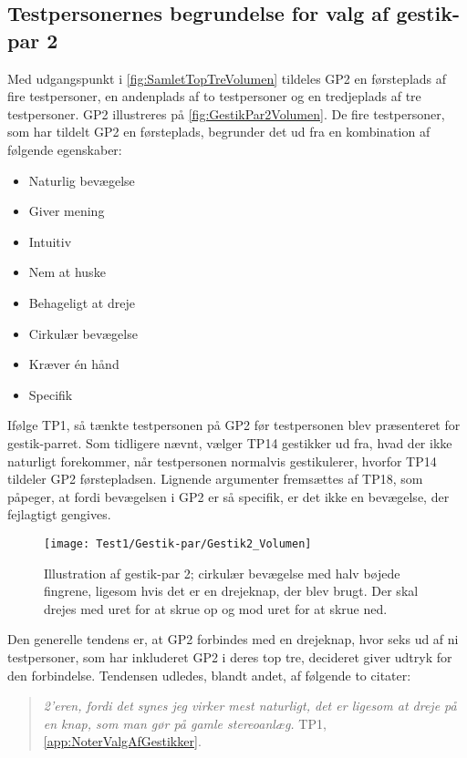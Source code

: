 \subsection{Testpersonernes begrundelse for valg af gestik-par 2}
\label{TestresultaterValgAfGestikkerBegrundelseGP2Volumen}
%
Med udgangspunkt i \autoref{fig:SamletTopTreVolumen} tildeles GP2 en førsteplads af fire testpersoner, en andenplads af to testpersoner og en tredjeplads af tre testpersoner. GP2 illustreres på \autoref{fig:GestikPar2Volumen}. De fire testpersoner, som har tildelt GP2 en førsteplads, begrunder det ud fra en kombination af følgende egenskaber: 
%
\begin{multicols}{3}
    \begin{itemize}
        \item Naturlig bevægelse
        \item Giver mening
        \item Intuitiv 
        \item Nem at huske
        \item Behageligt at dreje
        \item Cirkulær bevægelse
        \item Kræver én hånd
        \item Specifik
\end{itemize}
\end{multicols}
\noindent
%
Ifølge TP1, så tænkte testpersonen på GP2 før testpersonen blev præsenteret for gestik-parret. Som tidligere nævnt, vælger TP14 gestikker ud fra, hvad der ikke naturligt forekommer, når testpersonen normalvis gestikulerer, hvorfor TP14 tildeler GP2 førstepladsen. Lignende argumenter fremsættes af TP18, som påpeger, at fordi bevægelsen i GP2 er så specifik, er det ikke en bevægelse, der fejlagtigt gengives. 
%
\begin{figure}[H]
	\centering
	\texttt{[image: Test1/Gestik-par/Gestik2\_Volumen]}
	\caption{Illustration af gestik-par 2; cirkulær bevægelse med halv bøjede fingrene, ligesom hvis det er en drejeknap, der blev brugt. Der skal drejes med uret for at skrue op og mod uret for at skrue ned.}
	\label{fig:GestikPar2Volumen}
\end{figure}
\noindent
%
Den generelle tendens er, at GP2 forbindes med en drejeknap, hvor seks ud af ni testpersoner, som har inkluderet GP2 i deres top tre, decideret giver udtryk for den forbindelse. Tendensen udledes, blandt andet, af følgende to citater: 
%
\begin{quotation}
	\noindent
	\textit{2'eren, fordi det synes jeg virker mest naturligt, det er ligesom at dreje på en knap, som man gør på gamle stereoanlæg.} TP1, \autoref{app:NoterValgAfGestikker}.
\noindent
\end{quotation}
